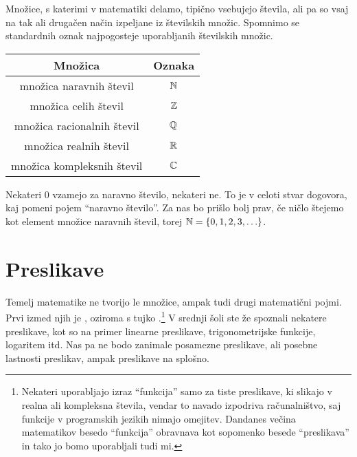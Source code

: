 
Množice, s katerimi v matematiki delamo, tipično vsebujejo števila, ali pa so vsaj na tak ali drugačen način izpeljane iz številskih množic. Spomnimo se standardnih oznak najpogosteje uporabljanih številskih množic.
\begin{center}
\begin{tabular}{|cc|}
\hline
\textbf{Množica} & \textbf{Oznaka} \\
\hline
množica naravnih števil & $\mathbb{N}$ \\
množica celih števil & $\mathbb{Z}$ \\
množica racionalnih števil & $\mathbb{Q}$ \\
množica realnih števil & $\mathbb{R}$ \\
množica kompleksnih števil & $\mathbb{C}$ \\
\hline
\end{tabular}
\end{center}

Nekateri $0$ vzamejo za naravno število, nekateri ne. To je v celoti stvar dogovora, kaj pomeni pojem ``naravno število''. Za nas bo prišlo bolj prav, če ničlo štejemo kot element množice naravnih števil, torej $\NN = \set{0, 1, 2, 3, \ldots}$.

\section{Preslikave}

Temelj matematike ne tvorijo le množice, ampak tudi drugi matematični pojmi. Prvi izmed
njih je , oziroma s tujko .\footnote{Nekateri uporabljajo
  izraz ``funkcija'' samo za tiste preslikave, ki slikajo v realna ali kompleksna števila,
  vendar to navado izpodriva računalništvo, saj funkcije v programskih jezikih nimajo
  omejitev. Dandanes večina matematikov besedo ``funkcija'' obravnava kot sopomenko besede
  ``preslikava'' in tako jo bomo uporabljali tudi mi.} V srednji šoli ste že spoznali
nekatere preslikave, kot so na primer linearne preslikave, trigonometrijske funkcije,
logaritem itd. Nas pa ne bodo zanimale posamezne preslikave, ali posebne lastnosti
preslikav, ampak preslikave na splošno.

